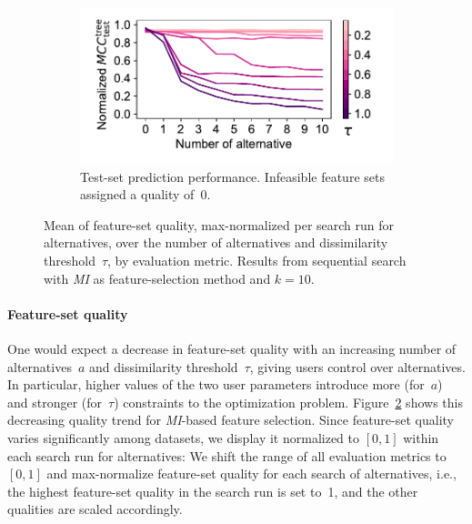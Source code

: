 \documentclass[iicol, sn-basic, Numbered]{sn-jnl} %
\theoremstyle{plain}
\theoremstyle{definition}
\begin{document}
\begin{figure}[t]
\begin{subfigure}[t]{0.49\textwidth}
		\includegraphics[width=\textwidth, trim=15 15 20 10, clip]{plots/afs-impact-num-alternatives-tau-decision-tree-test-mcc-max-fillna.pdf}
		\caption{
			Test-set prediction performance.
			Infeasible feature sets assigned a quality of~0.
		}
		\label{fig:afs:impact-num-alternatives-tau-decision-tree-test-mcc-max-fillna}
	\end{subfigure}
	\caption{
		Mean of feature-set quality, max-normalized per search run for alternatives, over the number of alternatives and dissimilarity threshold~$\tau$, by evaluation metric.
		Results from sequential search with \emph{MI} as feature-selection method and $k=10$.
	}
	\label{fig:afs:impact-num-alternatives-tau-quality}
\end{figure}

\paragraph{Feature-set quality}

One would expect a decrease in feature-set quality with an increasing number of alternatives~$a$ and dissimilarity threshold~$\tau$, giving users control over alternatives.
In particular, higher values of the two user parameters introduce more (for~$a$) and stronger (for~$\tau$) constraints to the optimization problem.
Figure~\ref{fig:afs:impact-num-alternatives-tau-quality} shows this decreasing quality trend for \emph{MI}-based feature selection.
Since feature-set quality varies significantly among datasets, we display it normalized to $[0,1]$ within each search run for alternatives:
We shift the range of all evaluation metrics to~$[0,1]$ and max-normalize feature-set quality for each search of alternatives, i.e., the highest feature-set quality in the search run is set to~1, and the other qualities are scaled accordingly.
\end{document}
